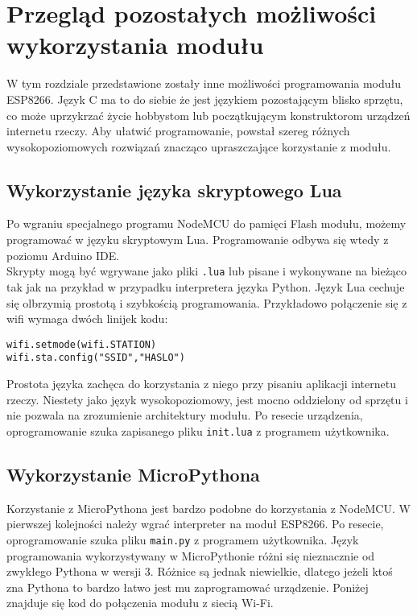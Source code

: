 \chapter{Przegląd pozostałych możliwości wykorzystania modułu}
\label{inne}

W tym rozdziale przedstawione zostały inne możliwości programowania 
modułu ESP8266. Język C ma to do siebie że jest językiem pozostającym 
blisko sprzętu, co może uprzykrzać życie hobbystom lub początkującym
konstruktorom urządzeń internetu rzeczy. Aby ułatwić programowanie, 
powstał szereg różnych wysokopoziomowych rozwiązań znacząco upraszczające 
korzystanie z modułu.

\section{Wykorzystanie języka skryptowego Lua}
\label{lua}
Po wgraniu specjalnego programu NodeMCU do pamięci Flash modułu,
możemy programować w języku skryptowym Lua. Programowanie odbywa się wtedy
z poziomu Arduino IDE.\\

Skrypty mogą być wgrywane jako pliki \verb+.lua+ lub pisane i wykonywane na bieżąco
tak jak na przykład w przypadku interpretera języka Python. Język Lua cechuje się 
olbrzymią prostotą i szybkością programowania. Przykładowo połączenie się z wifi 
wymaga dwóch linijek kodu:\\

\begin{lstlisting}[style=customjs,
    frame=single,
    caption={Kod łączący się z siecią Wi-Fi napisany w języku Lua},
    captionpos=b,
    label={lua_example}]
wifi.setmode(wifi.STATION)
wifi.sta.config("SSID","HASLO")
\end{lstlisting}

Prostota języka zachęca do korzystania z niego przy pisaniu aplikacji internetu 
rzeczy. Niestety jako język wysokopoziomowy, jest mocno oddzielony od sprzętu i nie 
pozwala na zrozumienie architektury modułu. Po resecie urządzenia, oprogramowanie szuka
zapisanego pliku \texttt{init.lua} z programem użytkownika.

\section{Wykorzystanie MicroPythona}
\label{micropython}
Korzystanie z MicroPythona jest bardzo podobne do korzystania z NodeMCU. W pierwszej
kolejności należy wgrać interpreter na moduł ESP8266. Po resecie, oprogramowanie szuka
pliku \texttt{main.py} z programem użytkownika.
Język programowania wykorzystywany w MicroPythonie różni się nieznacznie od zwykłego
Pythona w wersji 3. Różnice są jednak niewielkie, dlatego jeżeli ktoś zna Pythona to
bardzo łatwo jest mu zaprogramować urządzenie. Poniżej znajduje się kod 
do połączenia modułu z siecią Wi-Fi.

